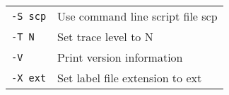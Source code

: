 \begin{center}
\begin{tabular}{|p{2.6cm}|p{8.2cm}|}
\texttt{-S scp}  &   Use command line script file scp \\


\texttt{-T N}  &   Set trace level to N \\


\texttt{-V}     &   Print version information\\


\texttt{-X ext} &   Set label file extension to ext \\ \hline


\end{tabular}




\end{center}

















